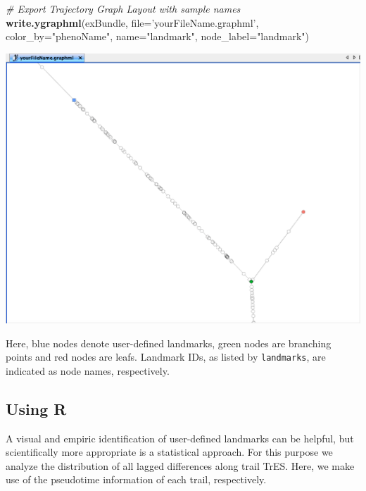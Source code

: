 \documentclass[]{book}
\newenvironment{Shaded}{\begin{snugshade}}{\end{snugshade}}
\newcommand{\KeywordTok}[1]{\textcolor[rgb]{0.13,0.29,0.53}{\textbf{#1}}}
\newcommand{\DataTypeTok}[1]{\textcolor[rgb]{0.13,0.29,0.53}{#1}}
\newcommand{\StringTok}[1]{\textcolor[rgb]{0.31,0.60,0.02}{#1}}
\newcommand{\CommentTok}[1]{\textcolor[rgb]{0.56,0.35,0.01}{\textit{#1}}}
\newcommand{\NormalTok}[1]{#1}
\theoremstyle{definition}
\theoremstyle{definition}
\theoremstyle{definition}
\theoremstyle{remark}
\begin{document}
\begin{Shaded}
\begin{Highlighting}[]
\CommentTok{# Export Trajectory Graph Layout with sample names}
\KeywordTok{write.ygraphml}\NormalTok{(exBundle, }\DataTypeTok{file=}\StringTok{'yourFileName.graphml'}\NormalTok{, }
               \DataTypeTok{color_by=}\StringTok{"phenoName"}\NormalTok{, }\DataTypeTok{name=}\StringTok{"landmark"}\NormalTok{, }
               \DataTypeTok{node_label=}\StringTok{"landmark"}\NormalTok{)}
\end{Highlighting}
\end{Shaded}

\includegraphics[width=0.7\linewidth]{img/yEd_9}

Here, blue nodes denote user-defined landmarks, green nodes are
branching points and red nodes are leafs. Landmark IDs, as listed by
\texttt{landmarks}, are indicated as node names, respectively.

\subsection{Using R}\label{using-r}

A visual and empiric identification of user-defined landmarks can be
helpful, but scientifically more appropriate is a statistical approach.
For this purpose we analyze the distribution of all lagged differences
along trail TrES. Here, we make use of the pseudotime information of
each trail, respectively.
\end{document}
